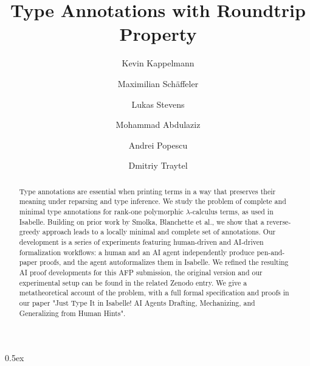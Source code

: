 \documentclass[11pt,a4paper]{article}
\begin{document}
\title{Type Annotations with Roundtrip Property}
\author{Kevin Kappelmann \and Maximilian Schäffeler \and Lukas Stevens \and Mohammad Abdulaziz \and Andrei Popescu \and Dmitriy Traytel}
\maketitle

\begin{abstract}
Type annotations are essential when printing terms in a way that preserves their meaning under reparsing and type inference. We study the problem of complete and minimal type annotations for rank-one polymorphic $\lambda$-calculus terms, as used in Isabelle.
Building on prior work by Smolka, Blanchette et al., we show that a reverse-greedy approach leads to a locally minimal and complete set of annotations.
Our development is a series of experiments featuring human-driven and AI-driven formalization workflows: a human and an AI agent independently produce pen-and-paper proofs, and the agent autoformalizes them in Isabelle.
We refined the resulting AI proof developments for this AFP submission, the original version and our experimental setup can be found in the related Zenodo entry.
We give a metatheoretical account of the problem, with a full formal specification and proofs in our paper "Just Type It in Isabelle! AI Agents Drafting, Mechanizing, and Generalizing from Human Hints".
\end{abstract}

\tableofcontents
\newpage

\parindent 0pt\parskip 0.5ex



%
%
\end{document}
